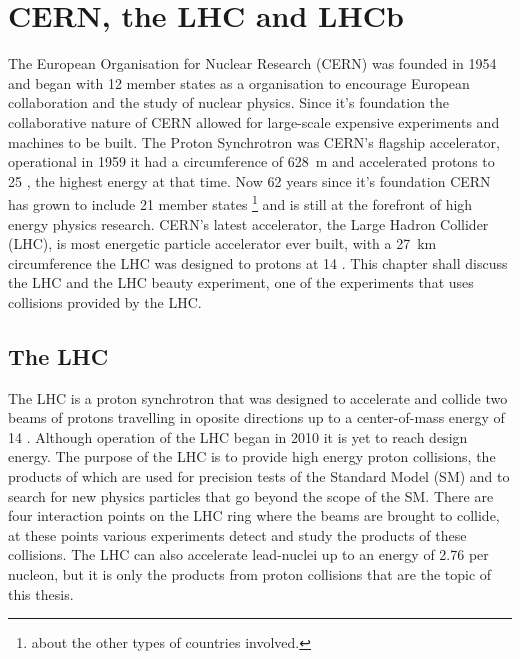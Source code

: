 \chapter{CERN, the LHC and LHCb}
\label{CERN_LHC_LHCb}

The European Organisation for Nuclear Research (CERN) was founded in 1954 and began with 12 member states as a organisation to encourage European collaboration and the study of nuclear physics. Since it's foundation the collaborative nature of CERN allowed for large-scale expensive experiments and machines to be built. The Proton Synchrotron was CERN's flagship accelerator, operational in 1959 it had a circumference of 628~m and accelerated protons to 25 \gev, the highest energy at that time. Now 62 years since it's foundation CERN has grown to include 21 member states \footnote{about the other types of countries involved.} and is still at the forefront of high energy physics research. CERN’s latest accelerator, the Large Hadron Collider (LHC), is most energetic particle accelerator ever built, with a 27~km circumference the LHC was designed to protons at 14 \tev. This chapter shall discuss the LHC and the LHC beauty experiment, one of the experiments that uses collisions provided by the LHC.

\section{The LHC}
\label{LHC}


The LHC is a proton synchrotron that was designed to accelerate and collide two beams of protons travelling in oposite directions up to a center-of-mass energy of 14 \tev. Although operation of the LHC began in 2010 it is yet to reach design energy. The purpose of the LHC is to provide high energy proton collisions, the products of which are used for precision tests of the Standard Model (SM) and to search for new physics particles that go beyond the scope of the SM. There are four interaction points on the LHC ring where the beams are brought to collide, at these points various experiments detect and study the products of these collisions. The LHC can also accelerate lead-nuclei up to an energy of 2.76 \tev per nucleon, but it is only the products from proton collisions that are the topic of this thesis.

